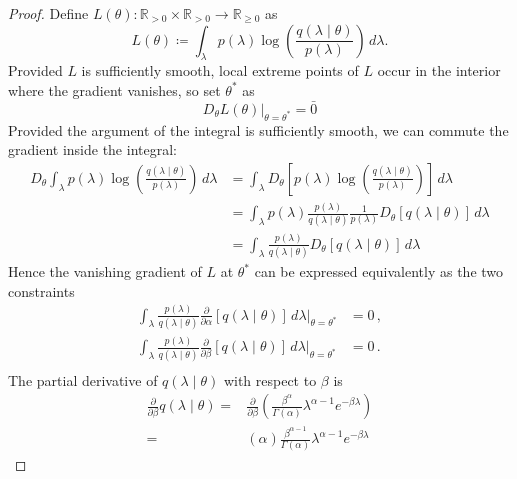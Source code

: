 \documentclass[twoside, 11pt]{article}
\newcommand{\reals}[0] {\mathbb{R}}
\begin{document}
\begin{proof}

Define $L(\theta) : \reals_{>0} \times \reals_{>0} \rightarrow \reals_{\geq 0}$ as
\begin{equation}
L(\theta) \coloneqq 
\int_{\lambda} p(\lambda) \log \left( \frac{q(\lambda \mid \theta) }{ p(\lambda) } \right) \, d\lambda .
\end{equation}
Provided $L$ is sufficiently smooth, local extreme points of $L$ occur in the interior where the gradient vanishes, so set $\theta^*$ as
\begin{equation}
D_{\theta} L(\theta) \bigr \rvert_{\theta=\theta^*} = \bar{0}
\end{equation}
Provided the argument of the integral is sufficiently smooth, we can commute the gradient inside the integral:
\begin{align}
D_{\theta}
\int_{\lambda} p(\lambda) \log \left( \frac{q(\lambda \mid \theta) }{ p(\lambda) } \right) \, d\lambda
& =
\int_{\lambda}
D_{\theta}
\left[
p(\lambda) \log \left( \frac{q(\lambda \mid \theta) }{ p(\lambda) } \right)
\right] \, d\lambda \\
& =
\int_{\lambda}
p(\lambda)
\frac{p(\lambda)}{q(\lambda \mid \theta)}
\frac{1}{p(\lambda)}
D_{\theta} \left[ q(\lambda \mid \theta) \right]
\, d\lambda \\
& =
\int_{\lambda}
\frac{p(\lambda)}{q(\lambda \mid \theta)}
D_{\theta} \left[ q(\lambda \mid \theta) \right]
\, d\lambda
\end{align}
Hence the vanishing gradient of $L$ at $\theta^*$ can be expressed equivalently as the two constraints
\begin{align}
\int_{\lambda}
\frac{p(\lambda)}{q(\lambda \mid \theta)}
\frac{\partial}{\partial \alpha} \left[ q(\lambda \mid \theta) \right]
\, d\lambda \bigr \vert_{\theta=\theta^*} & = 0 \, , \\
\int_{\lambda}
\frac{p(\lambda)}{q(\lambda \mid \theta)}
\frac{\partial}{\partial \beta} \left[ q(\lambda \mid \theta) \right]
\, d\lambda \bigr \vert_{\theta=\theta^*} & = 0 \, . \\
\end{align}
The partial derivative of $q(\lambda \mid \theta)$ with respect to $\beta$ is
\begin{align}
\frac{\partial}{\partial \beta} q(\lambda \mid \theta)
= & 
\frac{\partial}{\partial \beta} \left( \frac{\beta^{\alpha}}{\Gamma(\alpha)} \lambda^{\alpha-1} e^{-\beta \lambda} \right) \\
= &
(\alpha) \frac{\beta^{\alpha-1}}{\Gamma(\alpha)} \lambda^{\alpha-1} e^{-\beta \lambda}

\end{align}
\end{proof}
\end{document}
